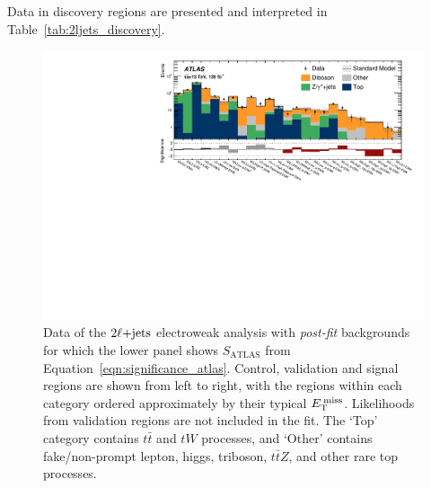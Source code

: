 Data in discovery regions are presented and interpreted in
Table~\ref{tab:2ljets_discovery}.



\begin{figure}[tp]
\centering
\includegraphics[width=\textwidth]{figures/2ljets_summary_log.pdf}
\caption{%
Data of the $2\ell\mathrm{+jets}$ electroweak analysis with \emph{post-fit} backgrounds
for which the lower panel shows $S_\mathrm{ATLAS}$ from
Equation~\ref{eqn:significance_atlas}.
Control, validation and signal regions are shown from left to right, with the
regions within each category ordered approximately by their typical $E_\mathrm{T}^\mathrm{\:miss}$.
Likelihoods from validation regions are not included in the fit.
The `Top' category contains $t\bar t$ and $tW$ processes, and
`Other' contains fake/non-prompt lepton, higgs, triboson, $t\bar tZ$, and other
rare top processes.%
}
\label{fig:2ljets_summary}
\end{figure}



